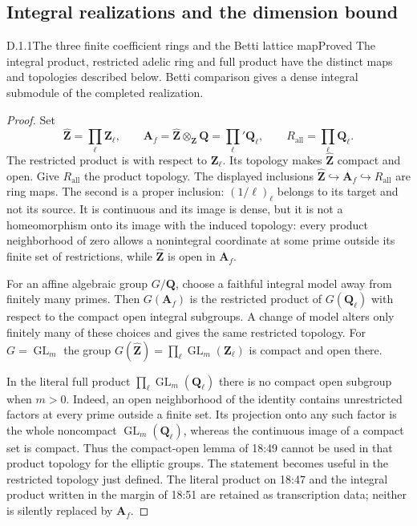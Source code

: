 \subsection{Integral realizations and the dimension bound}

\begin{result}{D.1.1}{The three finite coefficient rings and the Betti lattice map}{Proved}
The integral product, restricted adelic ring and full product have the distinct maps and topologies described below. Betti comparison gives a dense integral submodule of the completed realization.
\end{result}
\begin{proof}
Set
\[
\widehat{\mathbf Z}=\prod_\ell\mathbf Z_\ell,
\qquad
\mathbf A_f=\widehat{\mathbf Z}\otimes_{\mathbf Z}\mathbf Q
=\prod_\ell'\mathbf Q_\ell,
\qquad
R_{\mathrm{all}}=\prod_\ell\mathbf Q_\ell.
\]
The restricted product is with respect to \(\mathbf Z_\ell\). Its
topology makes \(\widehat{\mathbf Z}\) compact and open. Give
\(R_{\mathrm{all}}\) the product topology. The displayed inclusions
\(\widehat{\mathbf Z}\hookrightarrow\mathbf A_f\hookrightarrow
R_{\mathrm{all}}\) are ring maps. The second is a proper inclusion:
\((1/\ell)_\ell\) belongs to its target and not its source. It is
continuous and its image is dense, but it is not a homeomorphism onto
its image with the induced topology: every product neighborhood of zero
allows a nonintegral coordinate at some prime outside its finite set of
restrictions, while \(\widehat{\mathbf Z}\) is open in \(\mathbf A_f\).

For an affine algebraic group \(G/\mathbf Q\), choose a faithful integral
model away from finitely many primes. Then \(G(\mathbf A_f)\) is the
restricted product of \(G(\mathbf Q_\ell)\) with respect to the compact
open integral subgroups. A change of model alters only finitely many of
these choices and gives the same restricted topology. For
\(G=\operatorname{GL}_m\) the group
\(G(\widehat{\mathbf Z})=\prod_\ell\operatorname{GL}_m(\mathbf Z_\ell)\)
is compact and open there.

In the literal full product \(\prod_\ell\operatorname{GL}_m(\mathbf Q_\ell)\)
there is no compact open subgroup when \(m>0\). Indeed, an open
neighborhood of the identity contains unrestricted factors at every
prime outside a finite set. Its projection onto any such factor is the
whole noncompact \(\operatorname{GL}_m(\mathbf Q_\ell)\), whereas the
continuous image of a compact set is compact. Thus the compact-open
lemma of 18:49 cannot be used in that product topology for the elliptic
groups. The statement becomes useful in the restricted topology just
defined. The literal product on 18:47 and the integral product written
in the margin of 18:51 are retained as transcription data; neither is
silently replaced by \(\mathbf A_f\).


\end{proof}

